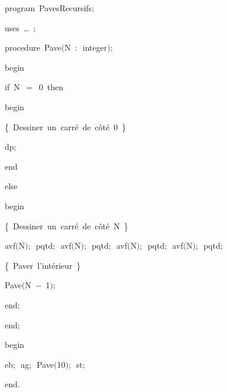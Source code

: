 
{
\parindent {}
\medskip

\carrenoir
\vspace{\neglskip}\mbox{\blc  \idt  \mcl program\idt \ PavesRecursifs$;$
}\par 
\vspace{\neglskip}\mbox{\blc \blk\idt \mcl uses\idt \ \ldots\ $;$
}\par 
\medskip

\pagebreak[3] 
\vspace{\neglskip}\mbox{\blc  \blk\idt  \mcl procedure\idt \ Pave$($N\ $:$\ integer$)$$;$}\par 
\vspace{\neglskip}\mbox{\blc  \blk\idt  \mcl begin\idt }\par 
\pagebreak[3] 
\vspace{\neglskip}\mbox{\blc  \blk\blk\idt  \mcl if\idt \ N\ $=$\ 0\ \mcl then\idt }\par 
\vspace{\neglskip}\mbox{\blc  \blk\blk\blk\idt  \mcl begin\idt }\par 
\vspace{\neglskip}\mbox{\blc  \blk\blk\blk\blk\idt  \cmt  \{\ Dessiner\ un\ carré\ de\ côté\ 0\ \}\idt \ \ \ }\par 
\vspace{\neglskip}\mbox{\blc  \blk\blk\blk\blk\idt  dp$;$}\par 
\vspace{\neglskip}\mbox{\blc  \blk\blk\blk\idt  \mcl end\idt }\par 
\pagebreak[3] 
\vspace{\neglskip}\mbox{\blc  \blk\blk\idt  \mcl else\idt }\par 
\vspace{\neglskip}\mbox{\blc  \blk\blk\blk\idt  \mcl begin\idt }\par 
\vspace{\neglskip}\mbox{\blc  \blk\blk\blk\blk\idt  \cmt  \{\ Dessiner\ un\ carré\ de\ côté\ N\ \}\idt }\par 
\vspace{\neglskip}\mbox{\blc  \blk\blk\blk\blk\idt  avf$($N$)$$;$\ pqtd$;$\ avf$($N$)$$;$\ pqtd$;$\ avf$($N$)$$;$\ pqtd$;$\ avf$($N$)$$;$\ pqtd$;$}\par 
\vspace{\neglskip}\mbox{\blc  \blk\blk\blk\blk\idt  \cmt  \{\ Paver\ l{'}intérieur\ \}\idt \ }\par 
\vspace{\neglskip}\mbox{\blc  \blk\blk\blk\blk\idt  Pave$($N\ $-$\ 1$)$$;$}\par 
\vspace{\neglskip}\mbox{\blc  \blk\blk\blk\idt  \mcl end\idt $;$}\par 
\vspace{\neglskip}\mbox{\blc  \blk\idt  \mcl end\idt $;$}\par 
\medskip

\vspace{\neglskip}\mbox{\blc  \idt  \mcl begin\idt }\par 
\vspace{\neglskip}\mbox{\blc  \blk\idt  eb$;$\ ag$;$\ Pave$($10$)$$;$\ st$;$}\par 
\vspace{\neglskip}\mbox{\blc  \idt  \mcl end\idt $.$}\par 

\medskip }


